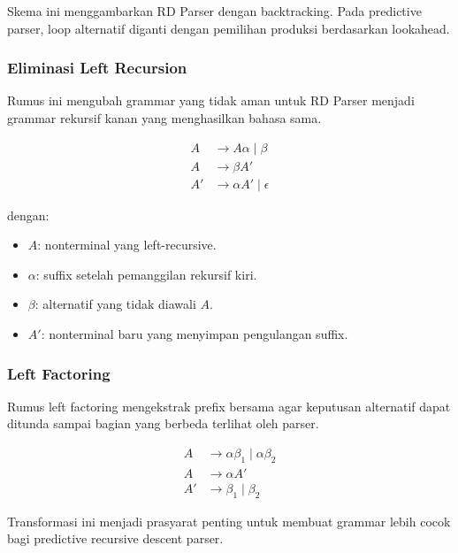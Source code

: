 Skema ini menggambarkan RD Parser dengan backtracking. Pada predictive parser, loop alternatif diganti dengan pemilihan produksi berdasarkan lookahead.

\subsubsection{Eliminasi Left Recursion}

\begin{jawab}
Rumus ini mengubah grammar yang tidak aman untuk RD Parser menjadi grammar rekursif kanan yang menghasilkan bahasa sama.
\end{jawab}

\begin{align}
    A &\rightarrow A\alpha \mid \beta \label{eq:left-rec-before}\\
    A &\rightarrow \beta A' \label{eq:left-rec-after-a}\\
    A' &\rightarrow \alpha A' \mid \epsilon \label{eq:left-rec-after-b}
\end{align}

dengan:
\begin{itemize}
    \item $A$: nonterminal yang left-recursive.
    \item $\alpha$: suffix setelah pemanggilan rekursif kiri.
    \item $\beta$: alternatif yang tidak diawali $A$.
    \item $A'$: nonterminal baru yang menyimpan pengulangan suffix.
\end{itemize}

\subsubsection{Left Factoring}

\begin{jawab}
Rumus left factoring mengekstrak prefix bersama agar keputusan alternatif dapat ditunda sampai bagian yang berbeda terlihat oleh parser.
\end{jawab}

\begin{align}
    A &\rightarrow \alpha\beta_1 \mid \alpha\beta_2 \label{eq:left-factor-before}\\
    A &\rightarrow \alpha A' \label{eq:left-factor-after-a}\\
    A' &\rightarrow \beta_1 \mid \beta_2 \label{eq:left-factor-after-b}
\end{align}

Transformasi ini menjadi prasyarat penting untuk membuat grammar lebih cocok bagi predictive recursive descent parser.
